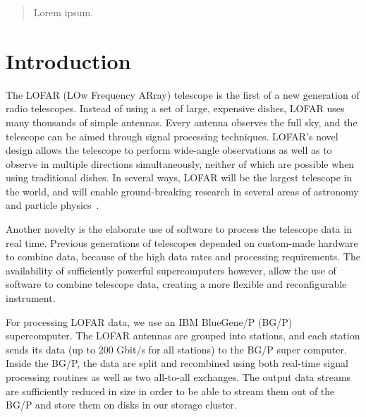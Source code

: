 \documentclass{llncs}
\begin{document}
\newcommand{\comment}[1]{}
\begin{abstract}
Lorem ipsum.
\end{abstract}
\section{Introduction}

\comment{
  EUROPAR 2011:
    - abstract 24 jan
    - deadline 31 jan
    - 12 pagina's LNCS, incl broncode
}

\comment{
lofar:
  - overview
  - #stations
  - data rates

pulsar pipeline:  
  - new astronomical opportunities:
        - dynamic focus -> hundreds of simultaenous observations, which regular dishes must do sequentially
        - broad sky view -> surveys
        - extremely high data rates (up to 200 Gbit/s in, 18 Gbit/s out)
                - disks limits output rate, to be raised to 80Gbit/s out.

==> power of parallel machines + flexibility of software = powerful telescope                

software correlator benefits:
  the- flexibility
  - fast rollout of experimental features
  - easy bugfixing
  - high level programming -> advanced and complex features

}

The LOFAR (LOw Frequency ARray) telescope is the first of a new generation of radio telescopes. Instead of using a set of large, expensive dishes, LOFAR uses many thousands of simple antennas. Every antenna observes the full sky, and the telescope can be aimed through signal processing techniques. LOFAR's novel design allows the telescope to perform wide-angle observations as well as to observe in multiple directions simultaneously, neither of which are possible when using traditional dishes. In several ways, LOFAR will be the largest telescope in the world, and will enable ground-breaking research in several areas of astronomy and particle physics~\cite{Bruyn:02}.

Another novelty is the elaborate use of software to process the telescope data in real time. Previous generations of telescopes depended on custom-made hardware to combine data, because of the high data rates and processing requirements. The availability of sufficiently powerful supercomputers however, allow the use of software to combine telescope data, creating a more flexible and reconfigurable instrument.

For processing LOFAR data, we use an IBM BlueGene/P (BG/P) supercomputer. The LOFAR antennas are grouped into stations, and each station sends its data (up to 200 Gbit/s for all stations) to the BG/P super computer. Inside the BG/P, the data are split and recombined using both real-time signal processing routines as well as two all-to-all exchanges. The output data streams are sufficiently reduced in size in order to be able to stream them out of the BG/P and store them on disks in our storage cluster.
\end{document}
